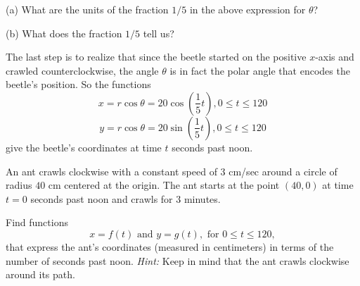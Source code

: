 \documentclass{ximera}
\begin{document}
\begin{question}  \label{Qgf45365:Motion1}
(a) What are the units of the fraction $1/5$ in the above expression for $\theta$?

(b) What does the fraction $1/5$ tell us?
\end{question}


The last step is to realize that since the beetle started on the positive $x$-axis and crawled counterclockwise, the angle $\theta$ is in fact the polar angle that encodes the beetle's position. So the functions
\[
    x = r\cos \theta = 20 \cos \left( \frac{1}{5}t \right) , 0\leq t \leq 120
\]
\[
    y = r\cos \theta = 20 \sin \left( \frac{1}{5}t \right) , 0\leq t \leq 120
\]
give the beetle's coordinates at time $t$ seconds past noon.


\begin{question}  \label{Q345tds5:Motion1}
An ant crawls clockwise with a constant speed of $3$ cm/sec around a circle of radius $40$ cm centered at the origin. The ant starts at the point $(40,0)$ at time $t=0$ seconds past noon and crawls for $3$ minutes.

Find functions
\[
   x = f(t) \text{ and } y=g(t) , \text{ for } 0\leq t \leq 120 ,
\]
that express the ant's coordinates (measured in centimeters) in terms of the number of seconds past noon. {\it Hint:} Keep in mind that the ant crawls clockwise around its path.



\end{question}
\end{document}
